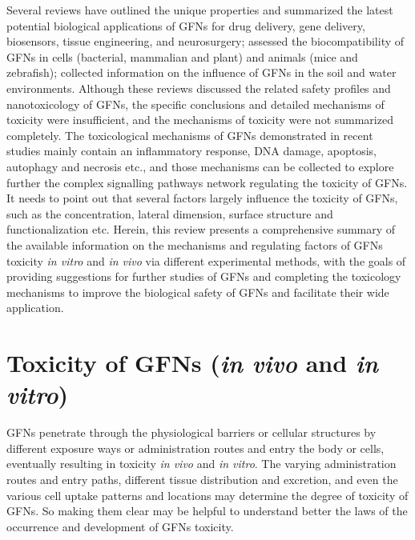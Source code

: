 \documentclass[twoside,twocolumn,9pt]{article}
\begin{document}
Several reviews have outlined the unique properties and summarized the latest potential biological applications of GFNs for drug delivery, gene delivery, biosensors, tissue engineering, and neurosurgery; assessed the biocompatibility of GFNs in cells (bacterial, mammalian and plant) and animals (mice and zebrafish); collected information on the influence of GFNs in the soil and water environments. Although these reviews discussed the related safety profiles and nanotoxicology of GFNs, the specific conclusions and detailed mechanisms of toxicity were insufficient, and the mechanisms of toxicity were not summarized completely. The toxicological mechanisms of GFNs demonstrated in recent studies mainly contain an inflammatory response, DNA damage, apoptosis, autophagy and necrosis etc., and those mechanisms can be collected to explore further the complex signalling pathways network regulating the toxicity of GFNs. It needs to point out that several factors largely influence the toxicity of GFNs, such as the concentration, lateral dimension, surface structure and functionalization etc. Herein, this review presents a comprehensive summary of the available information on the mechanisms and regulating factors of GFNs toxicity \textit{in vitro} and \textit{in vivo} via different experimental methods, with the goals of providing suggestions for further studies of GFNs and completing the toxicology mechanisms to improve the biological safety of GFNs and facilitate their wide application.


\section{Toxicity of GFNs (\textit{in vivo} and \textit{in vitro})}
GFNs penetrate through the physiological barriers or cellular structures by different exposure ways or administration routes and entry the body or cells, eventually resulting in toxicity \textit{in vivo} and \textit{in vitro}. The varying administration routes and entry paths, different tissue distribution and excretion, and even the various cell uptake patterns and locations may determine the degree of toxicity of GFNs. So making them clear may be helpful to understand better the laws of the occurrence and development of GFNs toxicity.
\end{document}
